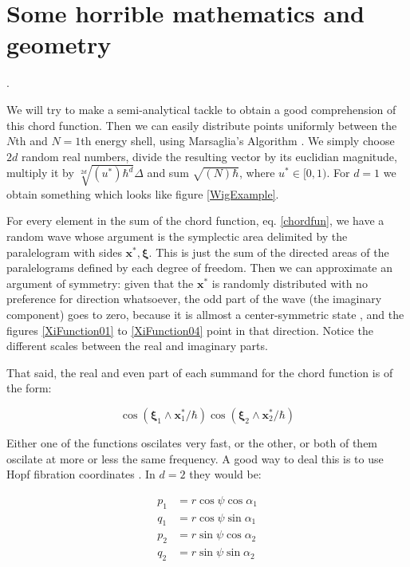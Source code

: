 \documentclass[a4paper,12pt]{article}
\newcommand{\xfase}{\mathbf{x}}
\newcommand{\xifase}{ {\boldsymbol{\xi}} }
\begin{document}
\section{Some horrible mathematics and geometry}.

We will try to make a semi-analytical tackle to obtain a good
comprehension of this chord function. 
Then we can easily distribute points uniformly between the 
$N$th and $N=1$th energy shell, using Marsaglia's Algorithm \cite{Mar72}.
We simply choose $2d$ random real numbers, divide the resulting
vector by its euclidian magnitude, multiply it by 
$\sqrt[2d]{(u^*)\hbar^d}\Delta$
and sum $\sqrt{(N)\hbar}$, where $u^* \in [0,1)$. 
For $d=1$ we obtain something
 which looks like figure \ref{WigExample}. 

For every element in the sum of the chord function, 
eq. \ref{chordfun}, we have a random wave whose argument
is the symplectic area delimited by the paralelogram 
with sides $\xfase^*, \xifase$. This is just the sum
of the directed areas of the paralelograms defined
by each degree of freedom. Then we can approximate an
argument of symmetry: given that the $\xfase^*$ is
randomly distributed with no preference for
direction whatsoever, the odd part of the wave
(the imaginary component) goes to zero, because
it is allmost a center-symmetric state \cite{Zambrano09},
and the figures \ref{XiFunction01} to \ref{XiFunction04}
point in that direction. Notice the different scales
between the real and imaginary parts. 

That said, the real and even part of each summand for the
chord function is of the form:

\begin{equation}
\cos(\xifase_1\wedge\xfase_1^*/\hbar)\cos(\xifase_2\wedge\xfase_2^*/\hbar)
\end{equation}

Either one of the functions oscilates very fast, or the other,
or both of them oscilate at more or less the same frequency. 
A good way to deal this is to use Hopf fibration coordinates
\cite{ArnoldDiff, Meyer}. In $d=2$ they would be:

\begin{equation}\label{TorSphere}
\begin{split}
p_1&=r \cos\psi \cos \alpha_1\\
q_1&=r \cos\psi \sin \alpha_1\\
p_2&=r \sin\psi \cos \alpha_2\\
q_2&=r \sin\psi \sin \alpha_2
\end{split}
\end{equation}
\end{document}
